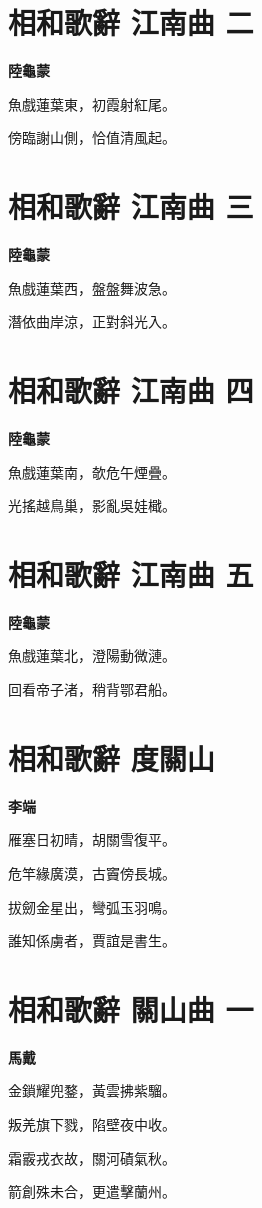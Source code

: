 \documentclass[12pt,a4paper]{ctexbook}
\begin{document}
\section{相和歌辭 江南曲 二}
\textbf{陸龜蒙}\par\vspace{0.5em}
魚戲蓮葉東，初霞射紅尾。\par
傍臨謝山側，恰值清風起。\par

\section{相和歌辭 江南曲 三}
\textbf{陸龜蒙}\par\vspace{0.5em}
魚戲蓮葉西，盤盤舞波急。\par
潛依曲岸涼，正對斜光入。\par

\section{相和歌辭 江南曲 四}
\textbf{陸龜蒙}\par\vspace{0.5em}
魚戲蓮葉南，欹危午煙疊。\par
光搖越鳥巢，影亂吳娃檝。\par

\section{相和歌辭 江南曲 五}
\textbf{陸龜蒙}\par\vspace{0.5em}
魚戲蓮葉北，澄陽動微漣。\par
回看帝子渚，稍背鄂君船。\par

\section{相和歌辭 度關山}
\textbf{李端}\par\vspace{0.5em}
雁塞日初晴，胡關雪復平。\par
危竿緣廣漠，古竇傍長城。\par
拔劒金星出，彎弧玉羽鳴。\par
誰知係虜者，賈誼是書生。\par

\section{相和歌辭 關山曲 一}
\textbf{馬戴}\par\vspace{0.5em}
金鎖耀兜鍪，黃雲拂紫騮。\par
叛羌旗下戮，陷壁夜中收。\par
霜霰戎衣故，關河磧氣秋。\par
箭創殊未合，更遣擊蘭州。\par
\end{document}
